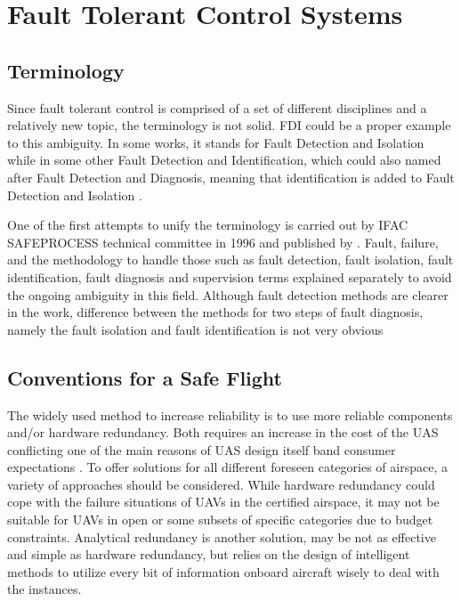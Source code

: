 \section{Fault Tolerant Control Systems}

\subsection{Terminology}\label{ch2:terminology}

Since fault tolerant control is comprised of a set of different disciplines and a relatively 
new topic, the terminology is not solid. FDI could be a proper example to this ambiguity. 
In some works, it stands for Fault Detection and Isolation while in some other 
Fault Detection and Identification, which could also named after Fault Detection and Diagnosis, 
meaning that identification is added to Fault Detection and Isolation \cite{zhang2008bibliographical}.

One of the first attempts to unify the terminology is carried out by IFAC SAFEPROCESS 
technical committee in 1996 and published by \cite{isermann1997trends}. Fault, failure, 
and the methodology to handle those such as fault detection, fault isolation, fault identification, 
fault diagnosis and supervision terms explained separately to avoid the ongoing ambiguity 
in this field. Although fault detection methods are clearer in the work, difference between 
the methods for two steps of fault diagnosis, namely the fault isolation and fault 
identification is not very obvious

\subsection{Conventions for a Safe Flight}\label{ch2:conventions}

The widely used method to increase reliability is to use more reliable components 
and/or hardware redundancy. Both requires an increase in the cost of the UAS 
conflicting one of the main reasons of UAS design itself band consumer expectations 
\cite{angelov2012sense}. To offer solutions for all different foreseen categories of 
airspace, a variety of approaches should be considered. While hardware redundancy 
could cope with the failure situations of UAVs in the certified airspace, it may not be 
suitable for UAVs in open or some subsets of specific categories due to budget 
constraints. Analytical redundancy is another solution, may be not as effective and 
simple as hardware redundancy, but relies on the design of intelligent methods to 
utilize every bit of information onboard aircraft wisely to deal with the instances.  

